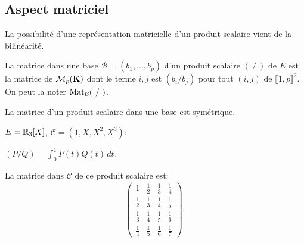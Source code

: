 \subsection{Aspect matriciel}
La possibilité d'une représentation matricielle d'un produit scalaire vient de la bilinéarité.
\begin{defi}
La matrice dans une base $\mathcal{B} = (b_1, ..., b_p)$ d'un produit scalaire $(~/~)$ de $E$ est la matrice de $\mathcal{M}_{p}(\mathbf{K})$ dont le terme $i,j$ est $(b_i/b_j)$ pour tout $(i,j)$ de $\llbracket 1,p \rrbracket^2$.  On peut la noter $\mathop{\mathrm{Mat}}_\mathcal{B} (~/~)$.
\end{defi}
\begin{prop}
La matrice d'un produit scalaire dans une base est symétrique.
\end{prop}
\begin{exple}
$E = \mathbb{R}_{3}[X]$, $\mathcal{C} = (1, X, X^2, X^3)$:
\begin{center}
$(P/Q) = \displaystyle \int_{0}^{1} P(t)Q(t) \, dt$.
\end{center}
La matrice dans $\mathcal{C}$ de ce produit scalaire est:
\begin{displaymath}
\renewcommand{\arraystretch}{1.8}
\begin{pmatrix}
1 & \frac{1}{2} & \frac{1}{3} & \frac{1}{4} \\
\frac{1}{2} & \frac{1}{3} & \frac{1}{4} & \frac{1}{5} \\
\frac{1}{3} & \frac{1}{4} & \frac{1}{5} & \frac{1}{6} \\
\frac{1}{4} & \frac{1}{5} & \frac{1}{6} & \frac{1}{7}
\end{pmatrix}.
\end{displaymath}
\end{exple}

